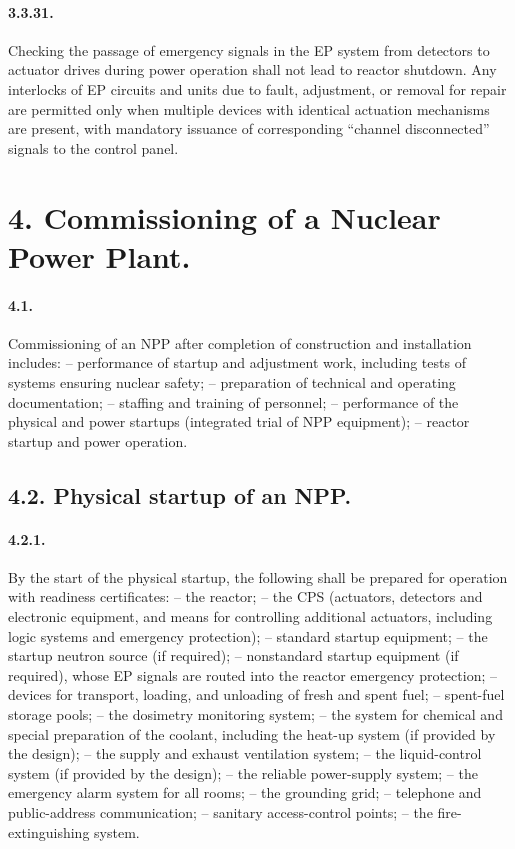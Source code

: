 \documentclass[openright]{bookest}
\begin{document}
\paragraph{3.3.31.} Checking the passage of emergency signals in the EP system from detectors to actuator drives during power operation shall not lead to reactor shutdown. Any interlocks of EP circuits and units due to fault, adjustment, or removal for repair are permitted only when multiple devices with identical actuation mechanisms are present, with mandatory issuance of corresponding ``channel disconnected'' signals to the control panel.

\section*{4. Commissioning of a Nuclear Power Plant.}

\paragraph{4.1.} Commissioning of an NPP after completion of construction and installation includes:
-- performance of startup and adjustment work, including tests of systems ensuring nuclear safety;
-- preparation of technical and operating documentation;
-- staffing and training of personnel;
-- performance of the physical and power startups (integrated trial of NPP equipment);
-- reactor startup and power operation.

\subsection*{4.2. Physical startup of an NPP.}

\paragraph{4.2.1.} By the start of the physical startup, the following shall be prepared for operation with readiness certificates:
-- the reactor;
-- the CPS (actuators, detectors and electronic equipment, and means for controlling additional actuators, including logic systems and emergency protection);
-- standard startup equipment;
-- the startup neutron source (if required);
-- nonstandard startup equipment (if required), whose EP signals are routed into the reactor emergency protection;
-- devices for transport, loading, and unloading of fresh and spent fuel;
-- spent-fuel storage pools;
-- the dosimetry monitoring system;
-- the system for chemical and special preparation of the coolant, including the heat-up system (if provided by the design);
-- the supply and exhaust ventilation system;
-- the liquid-control system (if provided by the design);
-- the reliable power-supply system;
-- the emergency alarm system for all rooms;
-- the grounding grid;
-- telephone and public-address communication;
-- sanitary access-control points;
-- the fire-extinguishing system.
\end{document}
